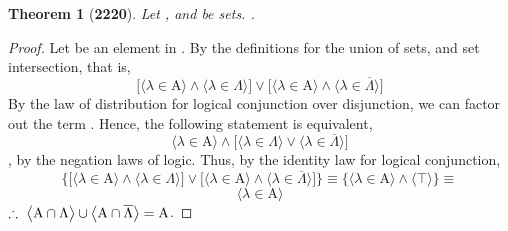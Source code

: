 \documentclass[preview]{standalone}
\newtheorem*{theorem*}{Theorem}
\begin{document}
\begin{theorem*}[\textbf{2220}] \color{black}
    Let , and \bm{$\Lambda$} be sets. 
    .
\end{theorem*}
\begin{proof} \color{black}
    Let \bm{$\lambda$} be an element in 
    .
    By the definitions for the union of sets, and set intersection, that is,
    \begin{equation*}
        \bigg[
            \Big \langle \lambda \in \mathrm{A} \Big \rangle
                \land
            \Big \langle \lambda \in \Lambda \Big \rangle
        \bigg]
            \lor
        \bigg[
            \Big \langle \lambda \in \mathrm{A} \Big \rangle
                \land
            \Big \langle \lambda \in \overline{\Lambda} \Big \rangle
        \bigg]
    \end{equation*} 
    By the law of distribution for logical conjunction over disjunction,
    we can factor out the term . 
    Hence, the following statement is equivalent,
    \begin{equation*}
        \Big \langle \lambda \in \mathrm{A} \Big \rangle
            \land
        \bigg[
            \Big \langle \lambda \in \Lambda \Big \rangle
                \lor
            \Big \langle \lambda \in \overline{\Lambda} \Big \rangle
        \bigg]
    \end{equation*}
    \bm{$
    \lambda \in \Lambda 
        \lor 
    \lambda \in \overline{\Lambda} 
        \equiv 
    \top
    $},
    by the negation laws of logic.
    Thus, by the identity law for logical conjunction,
    \begin{equation*}
        \Bigg\{
            \bigg[
                \Big \langle \lambda \in \mathrm{A} \Big \rangle
                    \land
                \Big \langle \lambda \in \Lambda \Big \rangle
            \bigg]
                \lor
            \bigg[
                \Big \langle \lambda \in \mathrm{A} \Big \rangle
                    \land
                \Big \langle \lambda \in \overline{\Lambda} \Big \rangle
            \bigg]
        \Bigg\}
            \equiv
        \Bigg\{
            \Big \langle \lambda \in \mathrm{A} \Big \rangle
                \land
            \Big \langle \top \Big \rangle
        \Bigg\}
            \equiv
    \end{equation*}
    \begin{equation*}
        \Big \langle \lambda \in \mathrm{A} \Big \rangle
    \end{equation*}
    $
    \therefore \text{\space} \relax{
    \big \langle \mathrm{A} \cap \Lambda \big \rangle 
        \cup 
    \big \langle \mathrm{A} \cap \overline{\Lambda} \big \rangle
        = 
    \mathrm{A}
    }$.
\color{lightgray} \end{proof}
\end{document}
